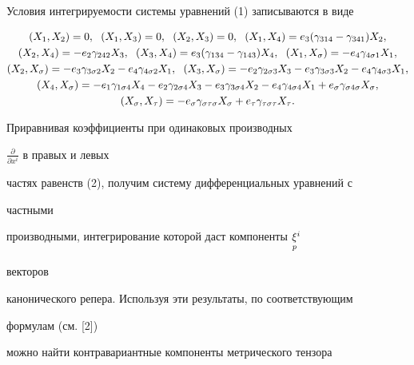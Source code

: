  


Условия интегрируемости системы уравнений (1) записываются в виде 


\begin{gather} 


(X_1,X_2)=0,\ \; (X_1,X_3)=0,\ \; (X_2,X_3)=0, 


\ \; (X_1,X_4)=e_3(\gamma_{314}-\gamma_{341})X_2,\notag\\ 


%


(X_2,X_4)=-e_2\gamma_{242}X_3, \ \;(X_3,X_4)= 


e_3(\gamma_{134}-\gamma_{143})X_4,\ \; (X_1,X_\sigma)= 


-e_4\gamma_{4\sigma1}X_1,\notag \\ 


%


(X_2,X_\sigma)=-e_3\gamma_{3\sigma2}X_2- 


e_4\gamma_{4\sigma2}X_1, \ \; (X_3,X_\sigma)= 


-e_2\gamma_{2\sigma3}X_3-e_3\gamma_{3\sigma3}X_2- 


e_4\gamma_{4\sigma3}X_1,\notag \\ 


(X_4,X_\sigma)=-e_1\gamma_{1\sigma4}X_4- 


e_2\gamma_{2\sigma4}X_3-e_3\gamma_{3\sigma4}X_2- 


e_4\gamma_{4\sigma4}X_1+e_\sigma\gamma_{\sigma4\sigma}X_\sigma, \\ 


(X_\sigma,X_\tau)=-e_\sigma\gamma_{\sigma\tau\sigma}X_\sigma+ 


e_\tau\gamma_{\tau\sigma\tau}X_\tau. \notag


\end{gather} 


Приравнивая коэффициенты при одинаковых производных 


$\frac{\partial}{\partial x^i}$ в правых и левых  


частях равенств (2), получим систему дифференциальных уравнений с 


частными 


производными, интегрирование которой даст компоненты $\underset{p}{\xi}{}^i$ 


векторов 


канонического репера. Используя эти результаты, по соответствующим 


формулам (см. [2]) 


можно найти контравариантные компоненты метрического тензора 


